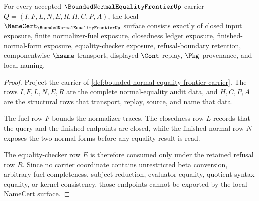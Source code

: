 \begin{theorem}
\label{thm:bounded-normal-equality-frontier-namecert-obligations}
For every accepted $\BoundedNormalEqualityFrontierUp$ carrier $Q=(I,F,L,N,E,R,H,C,P,A)$, the local $\NameCert_{\BoundedNormalEqualityFrontierUp}$ surface consists exactly of closed input exposure, finite normalizer-fuel exposure, closedness ledger exposure, finished-normal-form exposure, equality-checker exposure, refusal-boundary retention, componentwise $\hsame$ transport, displayed $\Cont$ replay, $\Pkg$ provenance, and local naming.
\end{theorem}
\begin{proof}
Project the carrier of \autoref{def:bounded-normal-equality-frontier-carrier}. The rows $I,F,L,N,E,R$ are the complete normal-equality audit data, and $H,C,P,A$ are the structural rows that transport, replay, source, and name that data.

The fuel row $F$ bounds the normalizer traces. The closedness row $L$ records that the query and the finished endpoints are closed, while the finished-normal row $N$ exposes the two normal forms before any equality result is read.

The equality-checker row $E$ is therefore consumed only under the retained refusal row $R$. Since no carrier coordinate contains unrestricted beta conversion, arbitrary-fuel completeness, subject reduction, evaluator equality, quotient syntax equality, or kernel consistency, those endpoints cannot be exported by the local NameCert surface.
\end{proof}

